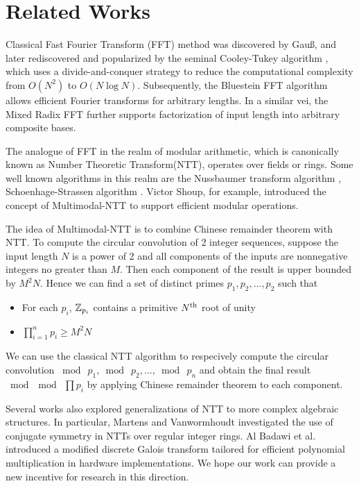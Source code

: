 \section{Related Works}
Classical Fast Fourier Transform (FFT) method was discovered by Gau{\ss}, and later rediscovered and popularized by the seminal Cooley-Tukey algorithm \cite{JSTOR:Cooley65,IEEE:Cooley67}, which uses a divide-and-conquer strategy to reduce the computational complexity from  \(O(N^2)\) to \(O(N \log N)\). Subsequently, the Bluestein FFT algorithm \cite{IEEE:Bluestein70} allows efficient Fourier transforms for arbitrary lengths. In a similar vei, the Mixed Radix FFT \cite{PNCC:ASCJ74} further supports  factorization of input length into arbitrary composite bases.

The analogue of FFT in the realm of modular arithmetic, which is canonically known as Number Theoretic Transform(NTT), operates over fields or rings. Some well known algorithms in this realm are the Nussbaumer transform algorithm \cite{IEEE:NussHen80}, Schoenhage-Strassen algorithm \cite{COMP:ShoeStra71}. Victor Shoup, for example, introduced the concept of Multimodal-NTT \cite{JSC:Shoup95} to support efficient modular operations.

The idea of Multimodal-NTT is to combine Chinese remainder theorem with NTT. To compute the circular convolution of 2 integer sequences, suppose the input length \(N\) is a power of 2 and all components of the inputs are nonnegative integers no greater than \(M\). Then each component of the result is upper bounded by \(M^2 N\). Hence we can find a set of distinct primes \(p_1, p_2, \ldots, p_2\) such that
\begin{itemize}
    \item For each \(p_i\), \(\mathbb{Z}_{p_i}\) contains a primitive \(N\textsuperscript{th}\) root of unity
    \item \(\prod_{i=1}^{n} p_i \ge M^2 N\)
\end{itemize}
We can use the classical NTT algorithm to respecively compute the circular convolution \(\bmod \  p_1, \bmod \  p_2, \ldots , \bmod \  p_n\) and obtain the final result \(\bmod \bmod \  \prod p_i\) by applying Chinese remainder theorem to each component.

Several works also explored generalizations of NTT to more complex algebraic structures. In particular, Martens and Vanwormhoudt \cite{IEEE:MartVan83} investigated the use of conjugate symmetry in NTTs over regular integer rings. Al Badawi et al. \cite{FICC:AAVBA19} introduced a modified discrete Galois transform tailored for efficient polynomial multiplication in hardware implementations. We hope our work can provide a new incentive for research in this direction.